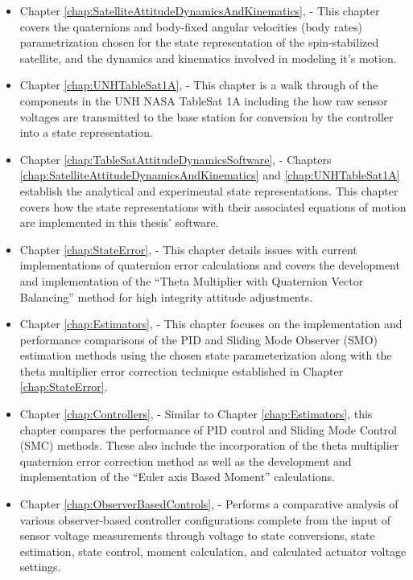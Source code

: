 \begin{itemize}
\item Chapter \ref{chap:SatelliteAttitudeDynamicsAndKinematics},  - This chapter covers the quaternions and body-fixed angular velocities (body rates) parametrization chosen for the state representation of the spin-stabilized satellite, and the dynamics and kinematics involved in modeling it's motion.
\item Chapter \ref{chap:UNHTableSat1A},  - This chapter is a walk through of the components in the UNH NASA TableSat 1A including the how raw sensor voltages are transmitted to the base station for conversion by the controller into a state representation.
\item Chapter \ref{chap:TableSatAttitudeDynamicsSoftware},  - Chapters \ref{chap:SatelliteAttitudeDynamicsAndKinematics} and \ref{chap:UNHTableSat1A} establish the analytical and experimental state representations.  This chapter covers how the state representations with their associated equations of motion are implemented in this thesis' software.
\item Chapter \ref{chap:StateError},  - This chapter details issues with current implementations of quaternion error calculations and covers the development and implementation of the ``Theta Multiplier with Quaternion Vector Balancing'' method for high integrity attitude adjustments.
\item Chapter \ref{chap:Estimators},  - This chapter focuses on the implementation and performance comparisons of the PID and Sliding Mode Observer (SMO) estimation methods using the chosen state parameterization along with the theta multiplier error correction technique established in Chapter \ref{chap:StateError}.
\item Chapter \ref{chap:Controllers},  - Similar to Chapter \ref{chap:Estimators}, this chapter compares the performance of PID control and Sliding Mode Control (SMC) methods.  These also include the incorporation of the theta multiplier quaternion error correction method as well as the development and implementation of the ``Euler axis Based Moment'' calculations.
\item Chapter \ref{chap:ObserverBasedControls},  - Performs a comparative analysis of various observer-based controller configurations complete from the input of sensor voltage measurements through voltage to state conversions, state estimation, state control, moment calculation, and calculated actuator voltage settings.

\end{itemize}
